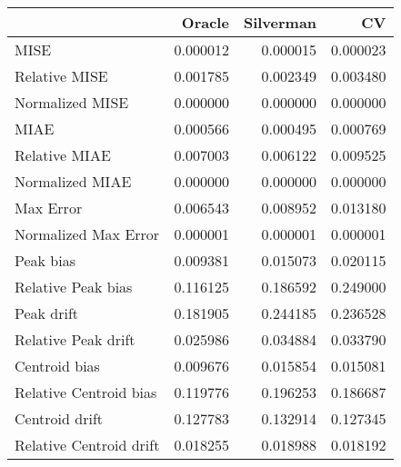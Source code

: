 \begin{tabular}{lrrr}
  \hline
 & Oracle & Silverman & CV \\ 
  \hline
MISE & 0.000012 & 0.000015 & 0.000023 \\ 
  Relative MISE & 0.001785 & 0.002349 & 0.003480 \\ 
  Normalized MISE & 0.000000 & 0.000000 & 0.000000 \\ 
  MIAE & 0.000566 & 0.000495 & 0.000769 \\ 
  Relative MIAE & 0.007003 & 0.006122 & 0.009525 \\ 
  Normalized MIAE & 0.000000 & 0.000000 & 0.000000 \\ 
  Max Error & 0.006543 & 0.008952 & 0.013180 \\ 
  Normalized Max Error & 0.000001 & 0.000001 & 0.000001 \\ 
  Peak bias & 0.009381 & 0.015073 & 0.020115 \\ 
  Relative Peak bias & 0.116125 & 0.186592 & 0.249000 \\ 
  Peak drift & 0.181905 & 0.244185 & 0.236528 \\ 
  Relative Peak drift & 0.025986 & 0.034884 & 0.033790 \\ 
  Centroid bias & 0.009676 & 0.015854 & 0.015081 \\ 
  Relative Centroid bias & 0.119776 & 0.196253 & 0.186687 \\ 
  Centroid drift & 0.127783 & 0.132914 & 0.127345 \\ 
  Relative Centroid drift & 0.018255 & 0.018988 & 0.018192 \\ 
   \hline
\end{tabular}
